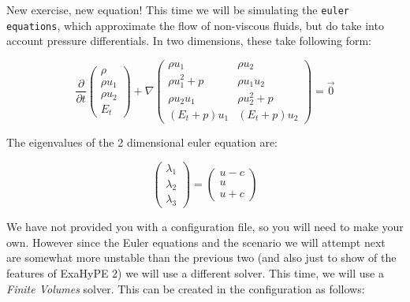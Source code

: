 \documentclass[12pt,letterpaper]{article}
\begin{document}
New exercise, new equation! This time we will be simulating the \texttt{euler equations},
which approximate the flow of non-viscous fluids, but do take into account pressure differentials.
In two dimensions, these take following form:

\begin{equation*} \label{Euler_equation}
    \frac{\partial}{\partial t}\left(
    \begin{array}{lr} \rho \\
                      \rho u_1 \\
                      \rho u_2 \\
                      E_t
                      \end{array} \right) +
    \nabla \begin{pmatrix}
                      \rho u_1          & \rho u_2\\
                      \rho u_1^2 + p    & \rho u_1 u_2 \\
                      \rho u_2 u_1      & \rho u_2^2 + p \\
                      (E_t + p) u_1     & (E_t + p) u_2
    \end{pmatrix}  = \vec{0}
\end{equation*}

The eigenvalues of the 2 dimensional euler equation are:

\begin{equation*}
    \left(
    \begin{array}{lr} \lambda_1 \\
                      \lambda_2 \\
                      \lambda_3
                      \end{array} \right) =
    \left(
    \begin{array}{lr} u - c \\
                      u \\
                      u + c
                      \end{array} \right)
\end{equation*}

We have not provided you with a configuration file, so you will need to make your own.
However since the Euler equations and the scenario we will attempt next are somewhat more unstable than the previous two (and also just to show of the features of ExaHyPE 2)
we will use a different solver. This time, we will use a \textit{Finite Volumes} solver.
This can be created in the configuration as follows:
\end{document}
